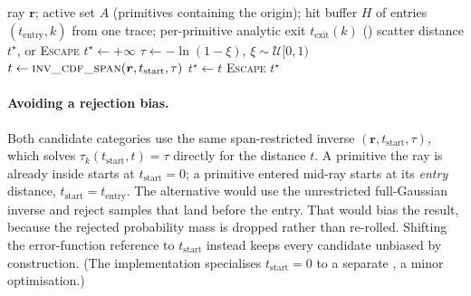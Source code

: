 \begin{algorithm}[htp]
\caption{Argmin scatter sampling for one ray (one path bounce).}
\label{alg:argmin}
\begin{algorithmic}[1]
\Require ray $\bm{r}$; active set $A$ (primitives containing the origin); hit buffer $H$ of entries
$(t_{\text{entry}}, k)$ from one trace; per-primitive analytic exit $t_{\text{exit}}(k)$ ()
\Ensure scatter distance $t^\star$, or \textsc{Escape}
\State $t^\star \gets +\infty$
 
  \State $\tau \gets -\ln(1-\xi)$, \quad $\xi \sim \mathcal{U}[0,1)$ 
  \State $t \gets \textproc{inv\_cdf\_span}(\bm{r}, t_{\text{start}}, \tau)$ 
    \State $t^\star \gets t$ 
  \EndIf
\EndFunction
{}
  \State {} 
\EndFor
{}
  \State {} 
\EndFor
{} \State \Return \textsc{Escape} \EndIf
\State \Return $t^\star$
\end{algorithmic}
\end{algorithm}

\paragraph{Avoiding a rejection bias.} Both candidate categories use the same span-restricted inverse
$(\bm{r}, t_{\text{start}}, \tau)$, which solves $\tau_k(t_{\text{start}}, t) =
\tau$ directly for the distance $t$. A primitive the ray is already inside starts at $t_{\text{start}}=0$;
a primitive entered mid-ray starts at its \emph{entry} distance, $t_{\text{start}}=t_{\text{entry}}$. The
alternative would use the unrestricted full-Gaussian inverse and reject samples that land before the
entry. That would bias the result, because the rejected probability mass is dropped rather than
re-rolled.
Shifting the error-function reference to $t_{\text{start}}$ instead keeps every candidate unbiased by
construction. (The implementation specialises $t_{\text{start}}=0$ to a separate , a
minor optimisation.)

